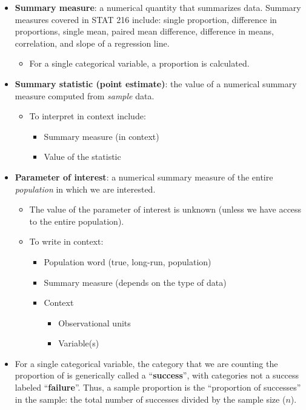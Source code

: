 \documentclass[
]{report}
\providecommand{\tightlist}{%
  \setlength{\itemsep}{0pt}\setlength{\parskip}{0pt}}
\begin{document}
\begin{itemize}
\item
  \textbf{Summary measure}: a numerical quantity that summarizes data. Summary measures covered in STAT 216 include: single proportion, difference in proportions, single mean, paired mean difference, difference in means, correlation, and slope of a regression line.

  \begin{itemize}
  \tightlist
  \item
    For a single categorical variable, a proportion is calculated.
  \end{itemize}
\item
  \textbf{Summary statistic (point estimate)}: the value of a numerical summary measure computed from \emph{sample} data.

  \begin{itemize}
  \item
    To interpret in context include:

    \begin{itemize}
    \item
      Summary measure (in context)
    \item
      Value of the statistic
    \end{itemize}
  \end{itemize}
\item
  \textbf{Parameter of interest}: a numerical summary measure of the entire \emph{population} in which we are interested.

  \begin{itemize}
  \item
    The value of the parameter of interest is unknown (unless we have access to the entire population).
  \item
    To write in context:

    \begin{itemize}
    \item
      Population word (true, long-run, population)
    \item
      Summary measure (depends on the type of data)
    \item
      Context

      \begin{itemize}
      \item
        Observational units
      \item
        Variable(s)
      \end{itemize}
    \end{itemize}
  \end{itemize}
\item
  For a single categorical variable, the category that we are counting the proportion of is generically called a ``\textbf{success}'', with categories not a success labeled ``\textbf{failure}''. Thus, a sample proportion is the ``proportion of successes'' in the sample: the total number of successes divided by the sample size (\(n\)).
\end{itemize}
\end{document}

